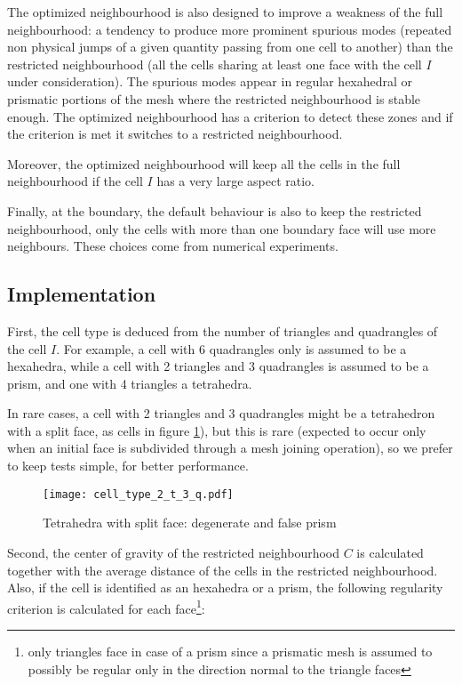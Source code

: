 The optimized neighbourhood is also designed to improve a weakness
of the full neighbourhood: a tendency to produce more prominent
spurious modes (repeated non physical jumps of a given quantity passing
from one cell to another) than the restricted neighbourhood (all the cells
sharing at least one face with the cell $I$ under consideration).
The spurious modes appear in regular hexahedral or prismatic portions
of the mesh where the restricted neighbourhood is stable enough. The
optimized neighbourhood has a criterion to detect these zones
and if the criterion is met it switches to a restricted neighbourhood.

Moreover, the optimized neighbourhood will keep all the cells in the full
neighbourhood if the cell $I$ has a very large aspect ratio.

Finally, at the boundary, the default behaviour is also to keep the restricted
neighbourhood, only the cells with more than one boundary face will use more
neighbours. These choices come from numerical experiments.

\subsection{Implementation}

First, the cell type is deduced from the number of triangles and quadrangles
of the cell $I$. For example, a cell with 6 quadrangles only is assumed to be
a hexahedra, while a cell with 2 triangles and 3 quadrangles is assumed to be
a prism, and one with 4 triangles a tetrahedra.

\begin{remark}
In rare cases, a cell with 2 triangles and 3 quadrangles might be a tetrahedron
with a split face, as cells in figure \ref{fig:false_prism}), but this is rare
(expected to occur only when an initial face is subdivided through a mesh joining
operation), so we prefer to keep tests simple, for better performance.

\begin{figure}[h]
  \centering
  \texttt{[image: cell\_type\_2\_t\_3\_q.pdf]}
  \caption{Tetrahedra with split face: degenerate and false prism}
  \label{fig:false_prism}
\end{figure}
\end{remark}

Second, the center of gravity of the restricted neighbourhood $C$ is calculated
together with the average distance of the cells in the restricted neighbourhood.
Also, if the cell is identified as an hexahedra or a prism,
the following regularity criterion is calculated for each face\footnote{only
triangles face in case of a prism since a prismatic mesh is assumed to possibly
be regular only in the direction normal to the triangle faces}:

